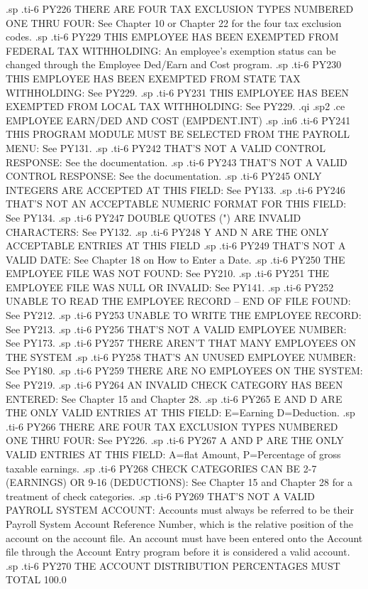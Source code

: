 .sp
.ti-6
PY226 THERE ARE FOUR TAX EXCLUSION TYPES NUMBERED ONE THRU FOUR: See Chapter
10 or Chapter 22 for the four tax exclusion codes.
.sp
.ti-6
PY229 THIS EMPLOYEE HAS BEEN EXEMPTED FROM FEDERAL TAX WITHHOLDING: An
employee's exemption status can be changed through the Employee Ded/Earn
and Cost program.
.sp
.ti-6
PY230 THIS EMPLOYEE HAS BEEN EXEMPTED FROM STATE TAX WITHHOLDING: See PY229.
.sp
.ti-6
PY231 THIS EMPLOYEE HAS BEEN EXEMPTED FROM LOCAL TAX WITHHOLDING: See PY229.
.qi
.sp2
.ce
EMPLOYEE EARN/DED AND COST (EMPDENT.INT)
.sp
.in6
.ti-6
PY241 THIS PROGRAM MODULE MUST BE SELECTED FROM THE PAYROLL MENU: See PY131.
.sp
.ti-6
PY242 THAT'S NOT A VALID CONTROL RESPONSE: See the documentation.
.sp
.ti-6
PY243 THAT'S NOT A VALID CONTROL RESPONSE: See the documentation.
.sp
.ti-6
PY245 ONLY INTEGERS ARE ACCEPTED AT THIS FIELD: See PY133.
.sp
.ti-6
PY246 THAT'S NOT AN ACCEPTABLE NUMERIC FORMAT FOR THIS FIELD: See PY134.
.sp
.ti-6
PY247 DOUBLE QUOTES (") ARE INVALID CHARACTERS: See PY132.
.sp
.ti-6
PY248 Y  AND  N   ARE THE ONLY ACCEPTABLE ENTRIES AT THIS FIELD
.sp
.ti-6
PY249 THAT'S NOT A VALID DATE: See Chapter 18 on How to Enter a Date.
.sp
.ti-6
PY250 THE EMPLOYEE FILE WAS NOT FOUND: See PY210.
.sp
.ti-6
PY251 THE EMPLOYEE FILE WAS NULL OR INVALID: See PY141.
.sp
.ti-6
PY252 UNABLE TO READ THE EMPLOYEE RECORD -- END OF FILE FOUND: See PY212.
.sp
.ti-6
PY253 UNABLE TO WRITE THE EMPLOYEE RECORD: See PY213.
.sp
.ti-6
PY256 THAT'S NOT A VALID EMPLOYEE NUMBER: See PY173.
.sp
.ti-6
PY257 THERE AREN'T THAT MANY EMPLOYEES ON THE SYSTEM
.sp
.ti-6
PY258 THAT'S AN UNUSED EMPLOYEE NUMBER: See PY180.
.sp
.ti-6
PY259 THERE ARE NO EMPLOYEES ON THE SYSTEM: See PY219.
.sp
.ti-6
PY264 AN INVALID CHECK CATEGORY HAS BEEN ENTERED: See Chapter 15 and
Chapter 28.
.sp
.ti-6
PY265 E AND D  ARE THE ONLY VALID ENTRIES AT THIS FIELD: E=Earning
D=Deduction.
.sp
.ti-6
PY266 THERE ARE FOUR TAX EXCLUSION TYPES NUMBERED ONE THRU FOUR: See PY226.
.sp
.ti-6
PY267 A AND P  ARE THE ONLY VALID ENTRIES AT THIS FIELD: A=flat Amount,
P=Percentage of gross taxable earnings.
.sp
.ti-6
PY268 CHECK CATEGORIES CAN BE  2-7 (EARNINGS) OR 9-16 (DEDUCTIONS):
See Chapter 15 and Chapter 28 for a treatment of check categories.
.sp
.ti-6
PY269 THAT'S NOT A VALID PAYROLL SYSTEM ACCOUNT:  Accounts must always
be referred to be their Payroll System Account Reference Number, which
is the relative position of the account on the account file.  An account
must have been entered onto the Account file through the Account Entry
program before it is considered a valid account.
.sp
.ti-6
PY270 THE ACCOUNT DISTRIBUTION PERCENTAGES MUST TOTAL 100.0%
